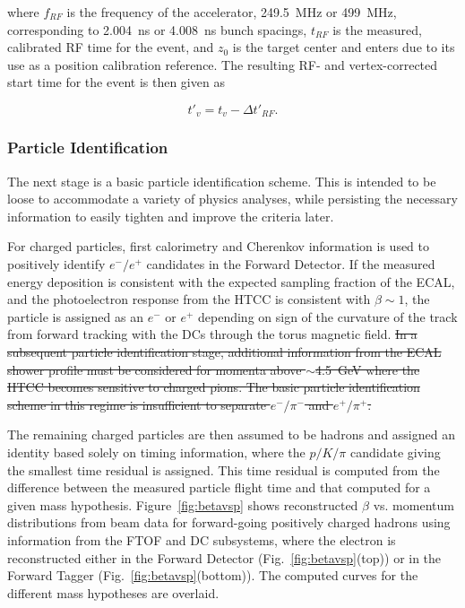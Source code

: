 \noindent
where $f_{RF}$ is the frequency of the accelerator, {\color{red}249.5~MHz or 499~MHz, corresponding to 2.004~ns or 4.008~ns bunch
spacings}, $t_{RF}$ is the measured, calibrated RF time for the event, and $z_0$ is the target center and enters
due to its use as a position calibration reference. The resulting RF- and vertex-corrected start time for the event
is then given as

\begin{equation}
  \label{eq:starttime}
t'_v = t_v - \Delta t'_{RF}.
\end{equation}

\subsubsection{Particle Identification}

The next stage is a basic particle identification scheme.  This is intended to be loose to accommodate a variety of
physics analyses, while persisting the necessary information to easily tighten and improve the criteria later.

For charged particles, first calorimetry and Cherenkov information is used to positively identify $e^-/e^+$
candidates in the Forward Detector. If the measured energy deposition is consistent with the expected sampling
fraction of the ECAL, and the photoelectron response from the HTCC is consistent with $\beta\sim1$, the particle
is assigned as an $e^-$ or $e^+$ depending on sign of the curvature of the track from forward tracking with the
DCs through the torus magnetic field. {\color{red}\sout{In a subsequent particle identification stage, additional information from the
ECAL shower profile must be considered for momenta above $\sim$4.5~GeV where the HTCC becomes sensitive to
charged pions. The basic particle identification scheme in this regime is insufficient to separate $e^-/\pi^-$ and
$e^+/\pi^+$.}}

The remaining charged particles are then assumed to be hadrons and assigned an identity based solely on timing
information, where the $p/K/\pi$ candidate giving the smallest time residual is assigned. This time residual is
computed from the difference between the measured particle flight time and that computed for a given mass
hypothesis. Figure~\ref{fig:betavsp} shows reconstructed $\beta$ vs. momentum distributions from beam data
for forward-going positively charged hadrons using information from the FTOF and DC subsystems, where the
electron is reconstructed either in the Forward Detector (Fig.~\ref{fig:betavsp}(top)) or in the Forward Tagger
(Fig.~\ref{fig:betavsp}(bottom)). The computed curves for the different mass hypotheses are overlaid.

